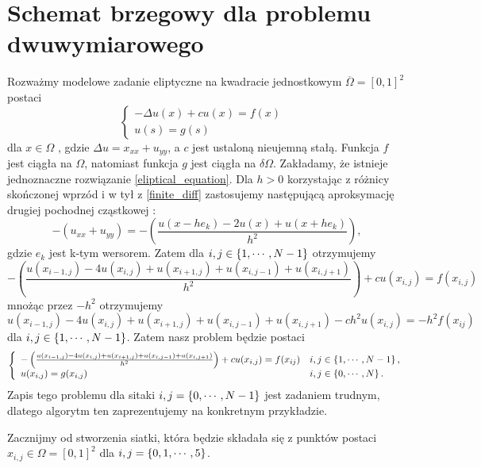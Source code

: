 \documentclass[12pt,a4paper]{report}
\begin{document}
\section{Schemat brzegowy dla problemu dwuwymiarowego}
\begin{problem}
Rozważmy modelowe zadanie eliptyczne na kwadracie jednostkowym $ \overline{\Omega} = [0,1]^2 $ postaci 
\begin{equation} \label{eliptical_equation}
\left\{ \begin{array}{ll}
-\Delta u(x) + cu(x) = f(x) & \\
u(s) = g(s) &
\end{array} \right.
\end{equation}
dla $ x \in \Omega $ , gdzie $\Delta u = x_{xx} + u_{yy}$, a $c$ jest ustaloną nieujemną stałą. Funkcja $f$ jest ciągła na $\Omega$, natomiast funkcja $g$ jest ciągła na $\delta \Omega$. Zakładamy, że istnieje jednoznaczne rozwiązanie \eqref{eliptical_equation}. Dla $h>0$ korzystając z różnicy skończonej wprzód i w tył z \eqref{finite_diff} zastosujemy następującą aproksymację drugiej pochodnej cząstkowej :
\begin{equation}
-(u_{xx} + u_{yy})= -\left(\frac{u(x-he_{k}) - 2u(x) + u(x+he_k)}{h^2}\right),
\end{equation}
gdzie $e_k$ jest k-tym wersorem. Zatem dla $ i,j \in \left\lbrace {1,\cdots,N-1} \right\rbrace $ otrzymujemy 
$$
-\left(\frac{u(x_{i-1,j}) - 4u(x_{i,j}) + u(x_{i+1,j})+u(x_{i,j-1})+u(x_{i,j+1})}{h^2}\right) + cu(x_{i,j}) = f(x_{i,j})
$$
mnożąc przez $-h^2$ otrzymujemy 
\begin{equation}\label{schemat_brzeg_II}
u(x_{i-1,j}) - 4u(x_{i,j}) + u(x_{i+1,j}) + u(x_{i,j-1}) + u(x_{i,j+1}) - ch^2u(x_{i,j}) = -h^2f(x_{ij})
\end{equation}
dla $i,j \in \left\lbrace {1,\cdots,N-1} \right\rbrace$. Zatem nasz problem będzie postaci
\begin{equation}
\left\{ \begin{array}{ll}
-\left(\frac{u(x_{i-1,j}) - 4u(x_{i,j}) + u(x_{i+1,j})+u(x_{i,j-1})+u(x_{i,j+1})}{h^2}\right) + cu(x_{i,j}) = f(x_{ij}) & i,j \in \left\lbrace {1,\cdots, N-1} \right\rbrace ,\\
u(x_{i,j}) = g(x_{i,j})  & i,j \in \left\lbrace {0,\cdots,N} \right\rbrace .
\end{array} \right.
\end{equation}
Zapis tego problemu dla sitaki $i,j = \left\lbrace {0,\cdots,N-1} \right\rbrace $ jest zadaniem trudnym, dlatego algorytm ten zaprezentujemy na konkretnym przykładzie.
\begin{example}
Zacznijmy od stworzenia siatki, która będzie składała się z punktów postaci $x_{i,j} \in \Omega = [0,1]^2$ dla $i,j = \left\lbrace {0,1,\cdots,5} \right\rbrace$.

\end{example}
\end{problem}
\end{document}
